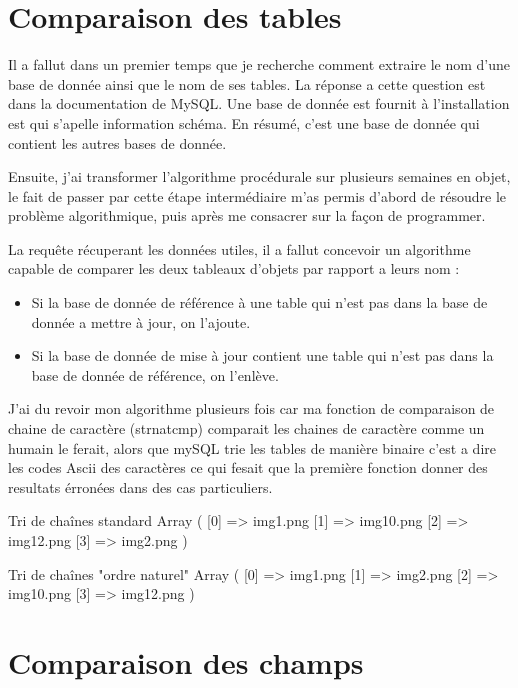 \section{Comparaison des tables}


Il a fallut dans un premier temps que je recherche comment extraire le nom
d'une base de donnée ainsi que le nom de ses tables. La réponse a cette
question est dans la documentation de MySQL. Une base de donnée est fournit à
l'installation est qui s'apelle information schéma. En résumé, c'est une base
de donnée qui contient les autres bases de donnée.

Ensuite, j'ai transformer l'algorithme procédurale sur plusieurs semaines en
objet, le fait de passer par cette étape intermédiaire m'as permis d'abord de
résoudre le problème algorithmique, puis après me consacrer sur la façon de
programmer.

La requête récuperant les données utiles, il a fallut concevoir un algorithme
capable de comparer les deux tableaux d'objets par rapport a leurs nom :
\begin{itemize}
    \item Si la base de donnée de référence à une table qui n'est
        pas dans la base de donnée a mettre à jour, on l'ajoute.
    \item Si la base de donnée de mise à jour contient une table qui n'est pas
        dans la base de donnée de référence, on l'enlève.
\end{itemize}

J'ai du revoir mon algorithme plusieurs fois car ma fonction de comparaison de
chaine de caractère (strnatcmp) comparait les chaines de caractère comme un
humain le ferait, alors que mySQL trie les tables de manière binaire c'est a
dire les codes Ascii des caractères ce qui fesait que la première fonction
donner des resultats érronées dans des cas particuliers.

Tri de chaînes standard
Array
(
    [0] => img1.png
    [1] => img10.png
    [2] => img12.png
    [3] => img2.png
)

Tri de chaînes "ordre naturel"
Array
(
    [0] => img1.png
    [1] => img2.png
    [2] => img10.png
    [3] => img12.png
)

\section{Comparaison des champs}

